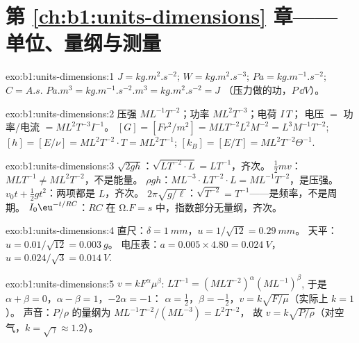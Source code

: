 \section*{第 \ref{ch:b1:units-dimensions} 章——单位、量纲与测量}

\begin{solution}{exo:b1:units-dimensions:1}
$\unit{J} = \unit{kg.m^2.s^{-2}}$; $\unit{W} = \unit{kg.m^2.s^{-3}}$;
$\unit{Pa} = \unit{kg.m^{-1}.s^{-2}}$; $\unit{C} = \unit{A.s}$.
$\unit{Pa.m^3} = \unit{kg.m^{-1}.s^{-2}.m^3} = \unit{kg.m^2.s^{-2}} = \unit{J}$
（压力做的功，$P\,\dd V$）。
\end{solution}

\begin{solution}{exo:b1:units-dimensions:2}
压强 $M L^{-1} T^{-2}$；功率 $M L^2 T^{-3}$；电荷 $I\,T$；
电压 $= $ 功率/电流 $= M L^2 T^{-3} I^{-1}$。
$[G] = [F r^2/m^2] = M L T^{-2} L^2 M^{-2} = L^3 M^{-1} T^{-2}$;
$[h] = [E/\nu] = M L^2 T^{-2} \cdot T = M L^2 T^{-1}$;
$[k_B] = [E/T] = M L^2 T^{-2} \Theta^{-1}$.
\end{solution}

\begin{solution}{exo:b1:units-dimensions:3}
$\sqrt{2gh}$：$\sqrt{L T^{-2} \cdot L} = L T^{-1}$，齐次。
$\tfrac12 mv$：$M L T^{-1} \neq M L^2 T^{-2}$，不是能量。
$\rho g h$：$M L^{-3} \cdot L T^{-2} \cdot L = M L^{-1} T^{-2}$，是压强。
$v_0 t + \tfrac12 g t^2$：两项都是 $L$，齐次。
$2\pi\sqrt{g/\ell}$：$\sqrt{T^{-2}} = T^{-1}$——是频率，不是周期。
$I_0\eu^{-t/RC}$：$RC$ 在 $\unit{\ohm.F} = \unit{s}$ 中，指数部分无量纲，齐次。
\end{solution}

\begin{solution}{exo:b1:units-dimensions:4}
直尺：$\delta = \qty{1}{mm}$，$u = 1/\sqrt{12} = \qty{0.29}{mm}$。
天平：$u = 0.01/\sqrt{12} = \qty{0.003}{g}$。
电压表：$a = 0.005 \times 4.80 = \qty{0.024}{V}$，
$u = 0.024/\sqrt3 = \qty{0.014}{V}$.
\end{solution}

\begin{solution}{exo:b1:units-dimensions:5}
$v = k F^\alpha \mu^\beta$: $L T^{-1} = (M L T^{-2})^\alpha (M L^{-1})^\beta$,
于是 $\alpha + \beta = 0$，$\alpha - \beta = 1$，$-2\alpha = -1$：
$\alpha = \tfrac12$，$\beta = -\tfrac12$，$v = k\sqrt{F/\mu}$（实际上 $k = 1$）。
声音：$P/\rho$ 的量纲为 $M L^{-1} T^{-2} / (M L^{-3}) = L^2 T^{-2}$，
故 $v = k\sqrt{P/\rho}$（对空气，$k = \sqrt\gamma \approx 1.2$）。
\end{solution}

